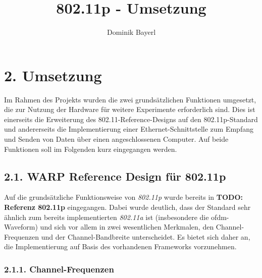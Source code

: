 \documentclass[ngerman,]{scrartcl}
\title{802.11p - Umsetzung}
\author{Dominik Bayerl}
\date{}
\begin{document}
\maketitle

\newcommand{\plusnamesingular}{}
\newcommand{\starnamesingular}{}
\newcommand{\xrefname}[1]{\protect\renewcommand{\plusnamesingular}{#1}}
\newcommand{\Xrefname}[1]{\protect\renewcommand{\starnamesingular}{#1}}
\providecommand{\cref}{\plusnamesingular~\ref}
\providecommand{\Cref}{\starnamesingular~\ref}
\providecommand{\crefformat}[2]{}
\providecommand{\Crefformat}[2]{}

\crefformat{figure}{fig.~#2#1#3}
\Crefformat{figure}{Figure~#2#1#3}
\crefformat{table}{Tab.~#2#1#3}
\Crefformat{table}{Table~#2#1#3}

\section{2. Umsetzung}\label{umsetzung}

Im Rahmen des Projekts wurden die zwei grundsätzlichen Funktionen
umgesetzt, die zur Nutzung der Hardware für weitere Experimente
erforderlich sind. Dies ist einerseits die Erweiterung des
802.11-Reference-Designs auf den 802.11p-Standard und andererseits die
Implementierung einer Ethernet-Schnittstelle zum Empfang und Senden von
Daten über einen angeschlossenen Computer. Auf beide Funktionen soll im
Folgenden kurz eingegangen werden.

\subsection{2.1. WARP Reference Design für
802.11p}\label{warp-reference-design-fuxfcr-802.11p}

Auf die grundsätzliche Funktionsweise von \emph{802.11p} wurde bereits
in \textbf{TODO: Referenz 802.11p} eingegangen. Dabei wurde deutlich,
dass der Standard sehr ähnlich zum bereits implementierten
\emph{802.11a} ist (insbesondere die \ac{ofdm}-Waveform) und sich vor
allem in zwei wesentlichen Merkmalen, den Channel-Frequenzen und der
Channel-Bandbreite unterscheidet. Es bietet sich daher an, die
Implementierung auf Basis des vorhandenen Frameworks vorzunehmen.

\subsubsection{2.1.1. Channel-Frequenzen}\label{channel-frequenzen}
\end{document}

